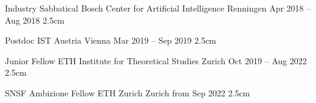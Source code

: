 \documentclass[11pt, a4paper]{awesome-cv}
\begin{document}
\begin{cventries}
  \cventry
    {Industry Sabbatical}
    {Bosch Center for Artificial Intelligence}
    {Renningen}
    {Apr 2018 -- Aug 2018}
    {}
    {2.5cm}

  \cventry
    {Postdoc} %
    {IST Austria} %
    {Vienna} %
    {Mar 2019 -- Sep 2019} %
    {}
    {2.5cm}

  \cventry
    {Junior Fellow}
    {ETH Institute for Theoretical Studies}
    {Zurich}
    {Oct 2019 -- Aug 2022}
    {}
    {2.5cm}

  \cventry
    {SNSF Ambizione Fellow}
    {ETH Zurich}
    {Zurich}
    {from Sep 2022}
    {}
    {2.5cm}
\end{cventries}

\nocite{*}
\printbibtabular[heading=none]


 
\end{document}
